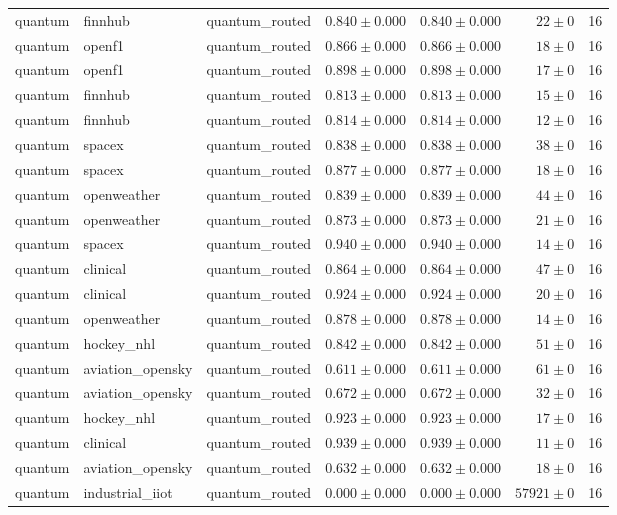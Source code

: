 \begin{table}[htbp]
\begin{tabular}{l l l r r r r}
quantum & finnhub & quantum\_routed & $0.840\pm0.000$ & $0.840\pm0.000$ & $22\pm0$ & 16 \\
quantum & openf1 & quantum\_routed & $0.866\pm0.000$ & $0.866\pm0.000$ & $18\pm0$ & 16 \\
quantum & openf1 & quantum\_routed & $0.898\pm0.000$ & $0.898\pm0.000$ & $17\pm0$ & 16 \\
quantum & finnhub & quantum\_routed & $0.813\pm0.000$ & $0.813\pm0.000$ & $15\pm0$ & 16 \\
quantum & finnhub & quantum\_routed & $0.814\pm0.000$ & $0.814\pm0.000$ & $12\pm0$ & 16 \\
quantum & spacex & quantum\_routed & $0.838\pm0.000$ & $0.838\pm0.000$ & $38\pm0$ & 16 \\
quantum & spacex & quantum\_routed & $0.877\pm0.000$ & $0.877\pm0.000$ & $18\pm0$ & 16 \\
quantum & openweather & quantum\_routed & $0.839\pm0.000$ & $0.839\pm0.000$ & $44\pm0$ & 16 \\
quantum & openweather & quantum\_routed & $0.873\pm0.000$ & $0.873\pm0.000$ & $21\pm0$ & 16 \\
quantum & spacex & quantum\_routed & $0.940\pm0.000$ & $0.940\pm0.000$ & $14\pm0$ & 16 \\
quantum & clinical & quantum\_routed & $0.864\pm0.000$ & $0.864\pm0.000$ & $47\pm0$ & 16 \\
quantum & clinical & quantum\_routed & $0.924\pm0.000$ & $0.924\pm0.000$ & $20\pm0$ & 16 \\
quantum & openweather & quantum\_routed & $0.878\pm0.000$ & $0.878\pm0.000$ & $14\pm0$ & 16 \\
quantum & hockey\_nhl & quantum\_routed & $0.842\pm0.000$ & $0.842\pm0.000$ & $51\pm0$ & 16 \\
quantum & aviation\_opensky & quantum\_routed & $0.611\pm0.000$ & $0.611\pm0.000$ & $61\pm0$ & 16 \\
quantum & aviation\_opensky & quantum\_routed & $0.672\pm0.000$ & $0.672\pm0.000$ & $32\pm0$ & 16 \\
quantum & hockey\_nhl & quantum\_routed & $0.923\pm0.000$ & $0.923\pm0.000$ & $17\pm0$ & 16 \\
quantum & clinical & quantum\_routed & $0.939\pm0.000$ & $0.939\pm0.000$ & $11\pm0$ & 16 \\
quantum & aviation\_opensky & quantum\_routed & $0.632\pm0.000$ & $0.632\pm0.000$ & $18\pm0$ & 16 \\
quantum & industrial\_iiot & quantum\_routed & $0.000\pm0.000$ & $0.000\pm0.000$ & $57921\pm0$ & 16 \\

\end{tabular}
\end{table}
